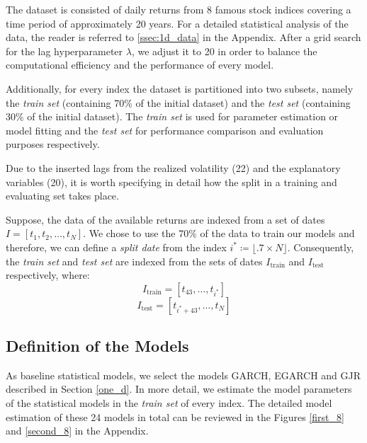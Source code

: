 \documentclass[a4paper, oneside]{discothesis}
\begin{document}
The dataset is consisted of daily returns from 8 famous stock indices covering a time period of approximately 20 years. For a detailed statistical analysis of the data, the reader is referred to \ref{ssec:1d_data} in the Appendix. After a grid search for the lag hyperparameter $\lambda$, we adjust it to 20 in order to balance the computational efficiency and the performance of every model. 

Additionally, for every index the dataset is partitioned into two subsets, namely the \textit{train set} (containing 70\% of the initial dataset) and the \textit{test set} (containing 30\% of the initial dataset). The \textit{train set} is used for parameter estimation or model fitting and the \textit{test set} for performance comparison and evaluation purposes respectively. 

\begin{mdframed}
\begin{remark}\label{ttsplit}
Due to the inserted lags from the realized volatility (22) and the explanatory variables (20), it is worth specifying in detail how the split in a training and evaluating set takes place.

Suppose, the data of the available returns are indexed from a set of dates $I = [t_1, t_2, \dots,t_N]$. We chose to use the 70\% of the data to train our models and therefore, we can define a \textit{split date} from the index $i^*\coloneqq\lfloor{.7\times N}\rfloor$. Consequently, the \textit{train set} and \textit{test set} are indexed from the sets of dates $I_\text{train}$ and $I_\text{test}$ respectively, where:
\[I_\text{train} = [t_{43}, \dots, t_{i^*}]\]
\[I_\text{test} = [t_{i^*+43}, \dots, t_{N}]\]
\end{remark}
\end{mdframed}
\subsection{Definition of the Models}
As baseline statistical models, we select the models GARCH, EGARCH and GJR described in Section \ref{one_d}. In more detail, we estimate the model parameters of the statistical models in the \textit{train set} of every index. The detailed model estimation of these 24 models in total can be reviewed in the Figures \ref{first_8} and \ref{second_8} in the Appendix. 
\end{document}
